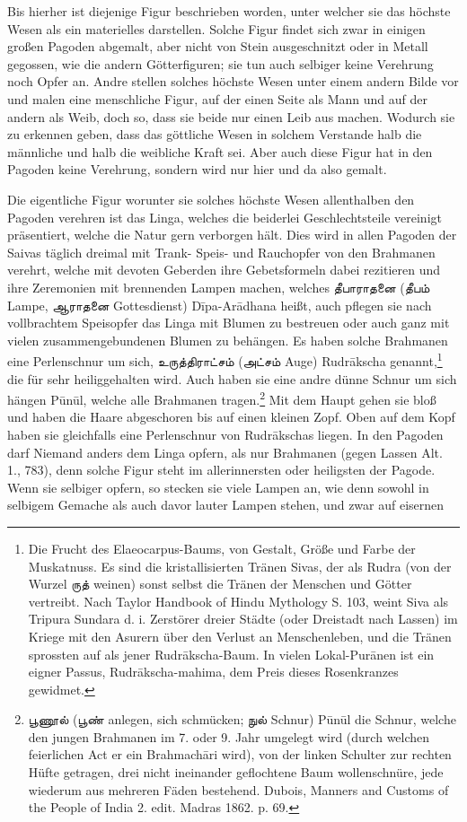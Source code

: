 \documentclass{article}
\newcommand{\TamilText}[1]{\texttamil{#1}}
\newcommand{\tam}[1]{\TamilText{#1}}
\begin{document}
Bis hierher ist diejenige Figur beschrieben worden, unter welcher sie das höchste Wesen als ein materielles darstellen. Solche Figur findet sich zwar in einigen großen Pagoden abgemalt, aber nicht von Stein ausgeschnitzt oder in Metall gegossen, wie die andern Götterfiguren; sie tun auch selbiger keine Verehrung noch Opfer an. Andre stellen solches höchste Wesen unter einem andern Bilde vor und malen eine menschliche Figur, auf der einen Seite als Mann und auf der andern als Weib, doch so, dass sie beide nur einen Leib aus machen. Wodurch sie zu erkennen geben, dass das göttliche Wesen in solchem Verstande halb die männliche und halb die weibliche Kraft sei. Aber auch diese Figur hat in den Pagoden keine Verehrung, sondern wird nur hier und da also gemalt.

Die eigentliche Figur worunter sie solches höchste Wesen allenthalben den Pagoden verehren ist das Linga, welches die beiderlei Geschlechtsteile vereinigt präsentiert, welche die Natur gern verborgen hält. Dies wird in allen Pagoden der Saivas täglich dreimal mit Trank- Speis- und Rauchopfer von den Brahmanen verehrt, welche mit devoten Geberden ihre Gebetsformeln dabei rezitieren und ihre Zeremonien mit brennenden Lampen machen, welches \tam{தீபாராதனை} (\tam{தீபம்} Lampe, \tam{ஆராதனை} Gottesdienst) D\={i}pa-Ar\={a}dhana heißt, auch pflegen sie nach vollbrachtem Speisopfer das Linga mit Blumen zu bestreuen oder auch ganz mit vielen zusammengebundenen Blumen zu behängen. Es haben solche Brahmanen eine Perlenschnur um sich, \tam{உருத்திராட்சம்} (\tam{அட்சம்} Auge) Rudr\={a}kscha genannt,\footnote{Die Frucht des Elaeocarpus-Baums, von Gestalt, Größe und Farbe der Muskatnuss. Es sind die kristallisierten Tränen Sivas, der als Rudra (von der Wurzel \tam{ருத்} weinen) sonst selbst die Tränen der Menschen und Götter vertreibt. Nach Taylor Handbook of Hindu Mythology S. 103, weint Siva als Tripura Sundara d. i. Zerstörer dreier Städte (oder Dreistadt nach Lassen) im Kriege mit den Asurern über den Verlust an Menschenleben, und die Tränen sprossten auf als jener Rudr\={a}kscha-Baum. In vielen Lokal-Pur\={a}nen ist ein eigner Passus, Rudr\={a}kscha-mahima, dem Preis dieses Rosenkranzes gewidmet.} die für sehr heiliggehalten wird. Auch haben sie eine andre dünne Schnur um sich hängen P\={u}n\={u}l, welche alle Brahmanen tragen.\footnote{\tam{பூணூல்} (\tam{பூண்} anlegen, sich schmücken; \tam{நுல்} Schnur) P\={u}n\={u}l die Schnur, welche den jungen Brahmanen im 7. oder 9. Jahr umgelegt wird (durch welchen feierlichen Act er ein Brahmach\={a}ri wird), von der linken Schulter zur rechten Hüfte getragen, drei nicht ineinander geflochtene Baum wollenschnüre, jede wiederum aus mehreren Fäden bestehend. Dubois, Manners and Customs of the People of India 2. edit. Madras 1862. p. 69.} Mit dem Haupt gehen sie bloß und haben die Haare abgeschoren bis auf einen kleinen Zopf. Oben auf dem Kopf haben sie gleichfalls eine Perlenschnur von Rudr\={a}kschas liegen. In den Pagoden darf Niemand anders dem Linga opfern, als nur Brahmanen (gegen Lassen Alt. 1., 783), denn solche Figur steht im allerinnersten oder heiligsten der Pagode. Wenn sie selbiger opfern, so stecken sie viele Lampen an, wie denn sowohl in selbigem Gemache als auch davor lauter Lampen stehen, und zwar auf eisernen 
\end{document}
